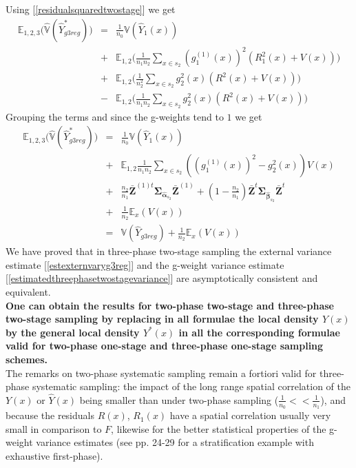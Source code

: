 \documentclass[a4paper,12pt,leqno, titlepage]{article}
\newcommand{\EX}{\mathbb{E}}
\newcommand{\VAR}{\mathbb{V}}
\begin{document}
Using [\ref{residualsquaredtwostage}] we get
\begin{eqnarray}\label{threetwogweightvar1}
\EX_{1,2,3}\big(\hat{\VAR}(\hat{Y}^*_{g3reg})\big)&=& \frac{1}{n_0}\VAR(\hat{Y}_1(x)) \nonumber \\
&+&\EX_{1,2}\Big(\frac{1}{n_1n_2}\sum_{x\in{s}_2}(g_1^{(1)}(x))^2(R_1^2(x)+V(x))\Big) \nonumber \\
&+&\EX_{1,2}\Big(\frac{1}{n^2_2}\sum_{x\in{s_2}}g_2^2(x)(R^2(x)+V(x))\Big) \nonumber \\
&-&\EX_{1,2}\Big(\frac{1}{n_1n_2}\sum_{x\in{s_2}}g_2^2(x)(R^2(x)+V(x))\Big)
\end{eqnarray}
Grouping the terms and since the g-weights tend to $1$ we get
\begin{eqnarray}\label{threetwogweightvar}
\EX_{1,2,3}\big(\hat{\VAR}(\hat{Y}^*_{g3reg})\big)&=& \frac{1}{n_0}\VAR(\hat{Y}_1(x))  \nonumber \\
&+& \EX_{1,2}\frac{1}{n_1n_2}\sum_{x\in{s}_2}((g_1^{(1)}(x))^2-g_2^2(x))V(x) \nonumber \\
&+&\frac{n_2}{n_1}\bar{\pmb{Z}}^{(1)t}
\pmb{\Sigma}_{\hat{\pmb{\alpha}}_{s_2}}\bar{\pmb{Z}}^{(1)} + (1-\frac{n_2}{n_1})\bar{\pmb{Z}}^{t}\pmb{\Sigma}_{\hat{\pmb{\beta}}_{s_2}}\bar{\pmb{Z}}^{t} \nonumber \\
&+& \frac{1}{n_2}\EX_x(V(x)) \nonumber \\
&=& \VAR(\hat{Y}_{g3reg})+ \frac{1}{n_2}\EX_x(V(x))
\end{eqnarray}
We have proved that in three-phase two-stage sampling the external variance estimate [\ref{estexternvaryg3reg}] and the g-weight variance estimate [\ref{estimatedthreephasetwostagevariance}] are asymptotically consistent and equivalent. \\
\textbf{One can obtain the results for two-phase two-stage and three-phase two-stage sampling by replacing in all formulae the local density $Y(x)$ by the general local density $Y^*(x)$ in all the corresponding formulae valid for two-phase one-stage and three-phase one-stage sampling schemes.}\\
The remarks on two-phase systematic sampling remain a fortiori valid for three-phase systematic sampling: the impact of the long range spatial correlation of the $Y(x)$ or $\hat{Y}(x)$ being smaller than under two-phase sampling ($\frac{1}{n_0}<<\frac{1}{n_1}$), and because the residuals $R(x)$, $R_1(x)$ have a spatial correlation usually very small in comparison to $F$, likewise for the better statistical properties of the g-weight variance estimates (see \cite{mandallazreport3} pp. 24-29 for a stratification example with exhaustive first-phase).
\end{document}
